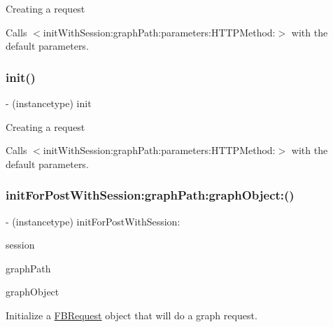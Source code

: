 Creating a request

Calls $<$init\+With\+Session\+:graph\+Path\+:parameters\+:\+H\+T\+T\+P\+Method\+:$>$ with the default parameters. \mbox{\label{interfaceFBRequest_a9e753030844abe92959a169b508f0a2b}} 
\subsubsection{\texorpdfstring{init()}{init()}\hspace{0.1cm}{\footnotesize\ttfamily [5/5]}}
{\footnotesize\ttfamily -\/ (instancetype) init \begin{DoxyParamCaption}{ }\end{DoxyParamCaption}}

Creating a request

Calls $<$init\+With\+Session\+:graph\+Path\+:parameters\+:\+H\+T\+T\+P\+Method\+:$>$ with the default parameters. \mbox{\label{interfaceFBRequest_a9cf5a9bb6a0d519efb2127ffeb0da2e8}} 
\subsubsection{\texorpdfstring{init\+For\+Post\+With\+Session\+:graph\+Path\+:graph\+Object\+:()}{initForPostWithSession:graphPath:graphObject:()}\hspace{0.1cm}{\footnotesize\ttfamily [1/5]}}
{\footnotesize\ttfamily -\/ (instancetype) init\+For\+Post\+With\+Session\+: \begin{DoxyParamCaption}\item[{(\hyperlink{interfaceFBSession}{F\+B\+Session} $\ast$)}]{session }\item[{graphPath:(N\+S\+String $\ast$)}]{graph\+Path }\item[{graphObject:(id$<$ \hyperlink{interfaceFBGraphObject}{F\+B\+Graph\+Object} $>$)}]{graph\+Object }\end{DoxyParamCaption}}

Initialize a {\ttfamily \hyperlink{interfaceFBRequest}{F\+B\+Request}} object that will do a graph request.

